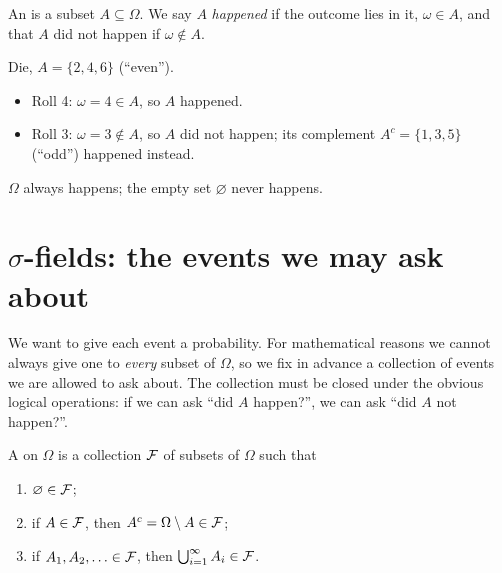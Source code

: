 \begin{definition}[Event]
An  is a subset $A\subseteq\Omega$. We say $A$ \emph{happened} if the outcome lies in it, $\omega\in A$, and that $A$ did not happen if $\omega\notin A$.
\end{definition}

\begin{example}
Die, $A=\{2,4,6\}$ (``even'').
\begin{itemize}
  \item Roll 4: $\omega=4\in A$, so $A$ happened.
  \item Roll 3: $\omega=3\notin A$, so $A$ did not happen; its complement $A^c=\{1,3,5\}$ (``odd'') happened instead.
\end{itemize}
$\Omega$ always happens; the empty set $\varnothing$ never happens.
\end{example}

\begin{pic}
\end{pic}

\section{\texorpdfstring{$\sigma$}{Sigma}-fields: the events we may ask about}

We want to give each event a probability. For mathematical reasons we cannot always give one to \emph{every} subset of $\Omega$, so we fix in advance a collection of events we are allowed to ask about. The collection must be closed under the obvious logical operations: if we can ask ``did $A$ happen?'', we can ask ``did $A$ not happen?''.

\begin{definition}
\label{def:sigma-field}
A  on $\Omega$ is a collection $\mathcal F$ of subsets of $\Omega$ such that
\begin{enumerate}[label=(\roman*)]
  \item $\varnothing\in\mathcal F$;
  \item if $A\in\mathcal F$, then $A^c=\Omega\setminus A\in\mathcal F$;
  \item if $A_1,A_2,\ldots\in\mathcal F$, then $\bigcup_{i=1}^\infty A_i\in\mathcal F$.
\end{enumerate}
\end{definition}

